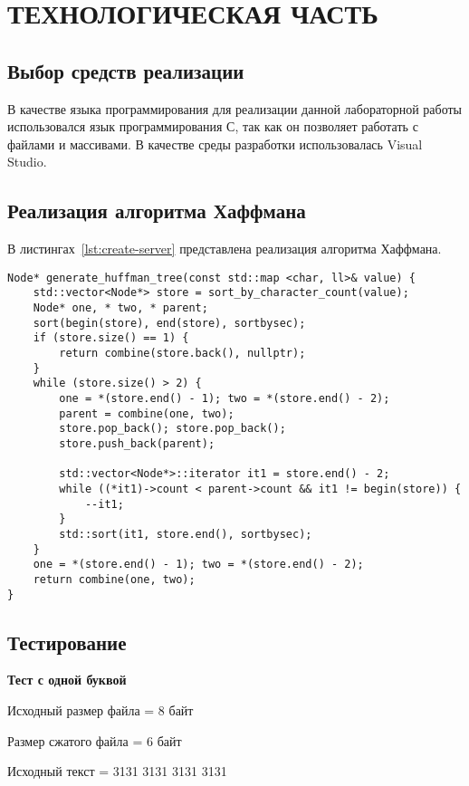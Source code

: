 \chapter{ТЕХНОЛОГИЧЕСКАЯ ЧАСТЬ}


\section{Выбор средств реализации}

В качестве языка программирования для реализации данной лабораторной работы
использовался язык программирования С, так как он позволяет работать с файлами и
массивами. В качестве среды разработки использовалась Visual Studio.

\section{Реализация алгоритма Хаффмана}

В листингах~\ref{lst:create-server} представлена реализация алгоритма Хаффмана.

\captionsetup{justification=raggedright,singlelinecheck=off}
\begin{lstlisting}[label=lst:create-server, caption=Реализация алгоритма Хаффмана]
Node* generate_huffman_tree(const std::map <char, ll>& value) {
	std::vector<Node*> store = sort_by_character_count(value);
	Node* one, * two, * parent;
	sort(begin(store), end(store), sortbysec);
	if (store.size() == 1) {
		return combine(store.back(), nullptr);
	}
	while (store.size() > 2) {
		one = *(store.end() - 1); two = *(store.end() - 2);
		parent = combine(one, two);
		store.pop_back(); store.pop_back();
		store.push_back(parent);
		
		std::vector<Node*>::iterator it1 = store.end() - 2;
		while ((*it1)->count < parent->count && it1 != begin(store)) {
			--it1;
		}
		std::sort(it1, store.end(), sortbysec);
	}
	one = *(store.end() - 1); two = *(store.end() - 2);
	return combine(one, two);
}
\end{lstlisting}

\section{Тестирование}

\textbf{Тест с одной буквой}

Исходный размер файла = 8 байт

Размер сжатого файла = 6 байт

Исходный текст = 3131 3131 3131 3131

